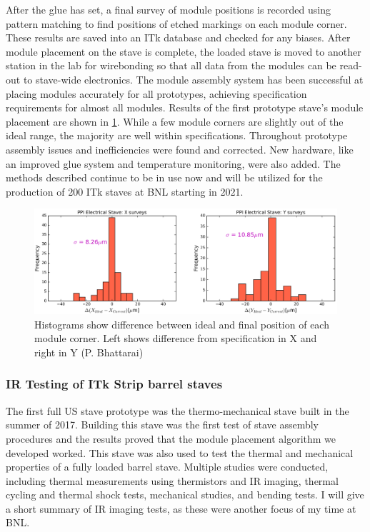 After the glue has set, a final survey of module positions is recorded using pattern matching to find positions of etched markings on each module corner. These results are saved into an ITk database and checked for any biases. After module placement on the stave is complete, the loaded stave is moved to another station in the lab for wirebonding so that all data from the modules can be read-out to stave-wide electronics. The module assembly system has been successful at placing modules accurately for all prototypes, achieving specification requirements for almost all modules. Results of the first prototype stave's module placement are shown in \ref{fig:placementresults}. While a few module corners are slightly out of the ideal range, the majority are well within specifications. Throughout prototype assembly issues and inefficiencies were found and corrected. New hardware, like an improved glue system and temperature monitoring, were also added. The methods described continue to be in use now and will be utilized for the production of 200 ITk staves at BNL starting in 2021. 

\begin{figure}[!h]
        \centering
    \includegraphics[width=.8\textwidth]{Pictures/placementresults.png}
    \caption{Histograms show difference between ideal and final position of each module corner. Left shows difference from specification in X and right in Y (P. Bhattarai)}
    \label{fig:placementresults}
\end{figure}

\subsubsection{IR Testing of ITk Strip barrel staves}
The first full US stave prototype was the thermo-mechanical stave built in the summer of 2017.  Building this stave was the first test of stave assembly procedures and the results proved that the module placement algorithm we developed worked. This stave was also used to test the thermal and mechanical properties of a fully loaded barrel stave. Multiple studies were conducted, including thermal measurements using thermistors and IR imaging, thermal cycling and thermal shock tests, mechanical studies, and bending tests. I will give a short summary of IR imaging tests, as these were another focus of my time at BNL. 

